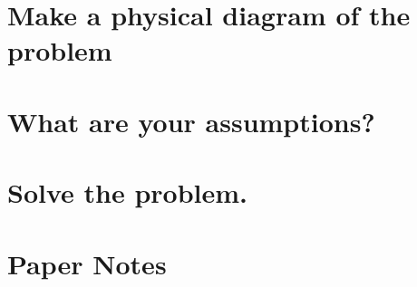 \documentclass{article}
\begin{document}
\section{Make a physical diagram of the problem}

\section{What are your assumptions?}

\section{Solve the problem.}



\section{Paper Notes}
\end{document}
